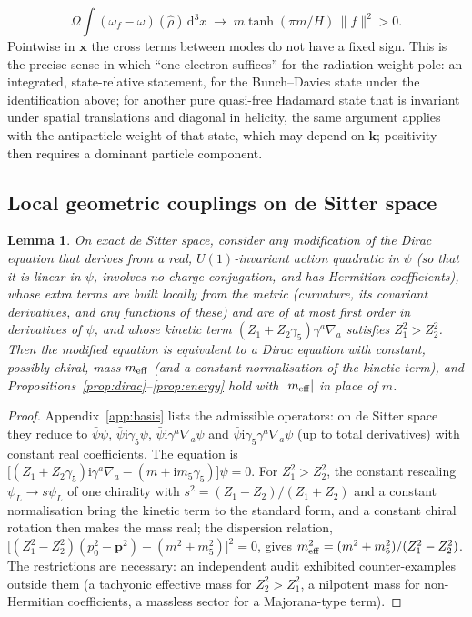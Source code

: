 \documentclass[11pt,a4paper]{article}
\newtheorem{lemma}{Lemma}
\theoremstyle{definition}
\newcommand{\dd}{\mathrm{d}}
\newcommand{\ii}{\mathrm{i}}
\begin{document}
\begin{equation}
\Omega\int(\omega_{f}-\omega)(\hat\rho)\,\dd^{3}x\;\longrightarrow\;m\tanh(\pi m/H)\,\|f\|^{2}>0 .
\end{equation}
Pointwise in $\mathbf{x}$ the cross terms between modes do not have a fixed sign. This is the precise sense in which ``one electron suffices'' for the radiation-weight pole: an integrated, state-relative statement, for the Bunch--Davies state under the identification above; for another pure quasi-free Hadamard state that is invariant under spatial translations and diagonal in helicity, the same argument applies with the antiparticle weight of that state, which may depend on $\mathbf{k}$; positivity then requires a dominant particle component.

\subsection{Local geometric couplings on de Sitter space}
\label{sec:coupling}

\begin{lemma}
\label{lem:coupling}
On exact de Sitter space, consider any modification of the Dirac equation that derives from a real, $U(1)$-invariant action quadratic in $\psi$ (so that it is linear in $\psi$, involves no charge conjugation, and has Hermitian coefficients), whose extra terms are built locally from the metric (curvature, its covariant derivatives, and any functions of these) and are of at most first order in derivatives of $\psi$, and whose kinetic term $(Z_{1}+Z_{2}\gamma_{5})\gamma^{a}\nabla_{a}$ satisfies $Z_{1}^{2}>Z_{2}^{2}$. Then the modified equation is equivalent to a Dirac equation with constant, possibly chiral, mass $m_{\rm eff}$ (and a constant normalisation of the kinetic term), and Propositions~\ref{prop:dirac}--\ref{prop:energy} hold with $|m_{\rm eff}|$ in place of $m$.
\end{lemma}
\begin{proof}
Appendix~\ref{app:basis} lists the admissible operators: on de Sitter space they reduce to $\bar\psi\psi$, $\bar\psi\ii\gamma_{5}\psi$, $\bar\psi\ii\gamma^{a}\nabla_{a}\psi$ and $\bar\psi\ii\gamma_{5}\gamma^{a}\nabla_{a}\psi$ (up to total derivatives) with constant real coefficients. The equation is $\big[(Z_{1}+Z_{2}\gamma_{5})\ii\gamma^{a}\nabla_{a}-(m+\ii m_{5}\gamma_{5})\big]\psi=0$. For $Z_{1}^{2}>Z_{2}^{2}$, the constant rescaling $\psi_{L}\to s\psi_{L}$ of one chirality with $s^{2}=(Z_{1}-Z_{2})/(Z_{1}+Z_{2})$ and a constant normalisation bring the kinetic term to the standard form, and a constant chiral rotation then makes the mass real; the dispersion relation, $\big[(Z_{1}^{2}-Z_{2}^{2})(p_{0}^{2}-\mathbf{p}^{2})-(m^{2}+m_{5}^{2})\big]^{2}=0$, gives $m_{\rm eff}^{2}=(m^{2}+m_{5}^{2})/(Z_{1}^{2}-Z_{2}^{2})$. The restrictions are necessary: an independent audit exhibited counter-examples outside them (a tachyonic effective mass for $Z_{2}^{2}>Z_{1}^{2}$, a nilpotent mass for non-Hermitian coefficients, a massless sector for a Majorana-type term).
\end{proof}
\end{document}
